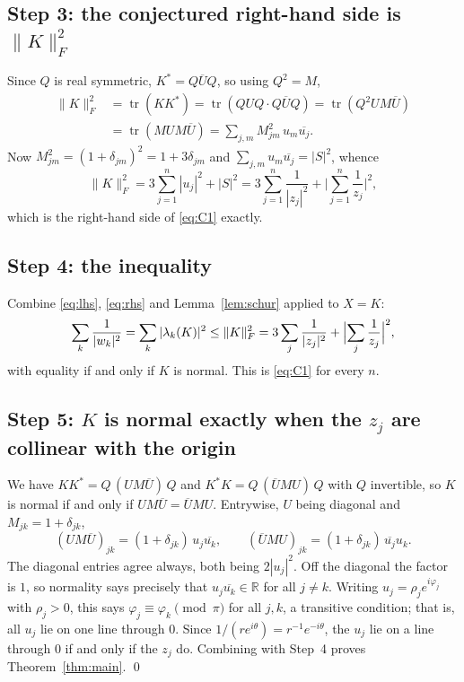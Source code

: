\documentclass[11pt]{amsart}
\theoremstyle{remark}
\newcommand{\RR}{\mathbb{R}}
\newcommand{\Frob}[1]{\lVert #1\rVert_F}
\newcommand{\tr}{\operatorname{tr}}
\begin{document}
\subsection*{Step 3: the conjectured right-hand side is $\Frob{K}^{2}$}

Since $Q$ is real symmetric, $K^{*}=Q\overline UQ$, so using $Q^{2}=M$,
\begin{align*}
  \Frob{K}^{2}
  &=\tr(KK^{*})=\tr(QUQ\cdot Q\overline UQ)
   =\tr(Q^{2}UM\overline U)\\
  &=\tr(MUM\overline U)
   =\sum_{j,m}M_{jm}^{2}\,u_m\overline{u_j}.
\end{align*}
Now $M_{jm}^{2}=(1+\delta_{jm})^{2}=1+3\delta_{jm}$ and
$\sum_{j,m}u_m\overline{u_j}=|S|^{2}$, whence
\begin{equation}\label{eq:rhs}
  \Frob{K}^{2}=3\sum_{j=1}^{n}|u_j|^{2}+|S|^{2}
  =3\sum_{j=1}^{n}\frac{1}{|z_j|^{2}}
   +\Biggl|\sum_{j=1}^{n}\frac{1}{z_j}\Biggr|^{2},
\end{equation}
which is the right-hand side of \eqref{eq:C1} exactly.

\subsection*{Step 4: the inequality}

Combine \eqref{eq:lhs}, \eqref{eq:rhs} and Lemma~\ref{lem:schur} applied to
$X=K$:
\[
  \sum_{k}\frac{1}{|w_k|^{2}}
  =\sum_k|\lambda_k(K)|^{2}
  \le\Frob{K}^{2}
  =3\sum_j\frac{1}{|z_j|^{2}}+\Bigl|\sum_j\frac1{z_j}\Bigr|^{2},
\]
with equality if and only if $K$ is normal. This is \eqref{eq:C1} for every
$n$.

\subsection*{Step 5: $K$ is normal exactly when the $z_j$ are collinear with
the origin}

We have $KK^{*}=Q\,(UM\overline U)\,Q$ and $K^{*}K=Q\,(\overline UMU)\,Q$ with
$Q$ invertible, so $K$ is normal if and only if
$UM\overline U=\overline UMU$. Entrywise, $U$ being diagonal and
$M_{jk}=1+\delta_{jk}$,
\[
  (UM\overline U)_{jk}=(1+\delta_{jk})\,u_j\overline{u_k},
  \qquad
  (\overline UMU)_{jk}=(1+\delta_{jk})\,\overline{u_j}u_k .
\]
The diagonal entries agree always, both being $2|u_j|^{2}$. Off the diagonal
the factor is $1$, so normality says precisely that
$u_j\overline{u_k}\in\RR$ for all $j\ne k$. Writing
$u_j=\rho_je^{i\varphi_j}$ with $\rho_j>0$, this says
$\varphi_j\equiv\varphi_k \pmod \pi$ for all $j,k$, a transitive condition;
that is, all $u_j$ lie on one line through $0$. Since
$1/(re^{i\theta})=r^{-1}e^{-i\theta}$, the $u_j$ lie on a line through $0$ if
and only if the $z_j$ do. Combining with Step~4 proves
Theorem~\ref{thm:main}. \qed
\end{document}
